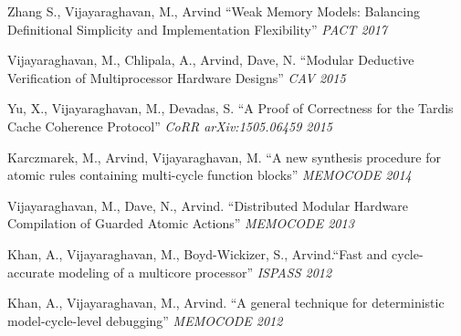 \documentclass[margin]{resume}
\begin{document}
\begin{resume}
    \vspace{-2mm}
    Zhang S., {Vijayaraghavan, M.}, Arvind ``Weak Memory Models: Balancing Definitional Simplicity and Implementation Flexibility'' \textit{PACT 2017}

    \vspace{-2mm}
    {Vijayaraghavan, M.}, Chlipala, A., Arvind, Dave, N.
    ``Modular Deductive Verification of Multiprocessor Hardware Designs'' \textit{CAV 2015}

    \vspace{-2mm}
    Yu, X., {Vijayaraghavan, M.}, Devadas, S.
    ``A Proof of Correctness for the Tardis Cache Coherence Protocol'' \textit{CoRR arXiv:1505.06459 2015}

    \vspace{-2mm}
    Karczmarek, M., Arvind, {Vijayaraghavan, M.}
    ``A new synthesis procedure for atomic rules containing multi-cycle function blocks'' \textit{MEMOCODE 2014}

    \vspace{-2mm}
    {Vijayaraghavan, M.}, Dave, N., Arvind.
    ``Distributed Modular Hardware Compilation of Guarded Atomic Actions'' \textit{MEMOCODE 2013}

    \vspace{-2mm}
    Khan, A., {Vijayaraghavan, M.}, Boyd-Wickizer, S., Arvind.``Fast and cycle-accurate modeling of 
    a multicore processor''
    \textit {ISPASS 2012}

    \vspace{-2mm}
    Khan, A., {Vijayaraghavan, M.}, Arvind. ``A general technique for deterministic model-cycle-level debugging''
    \textit{MEMOCODE 2012}


\end{resume}
\end{document}
